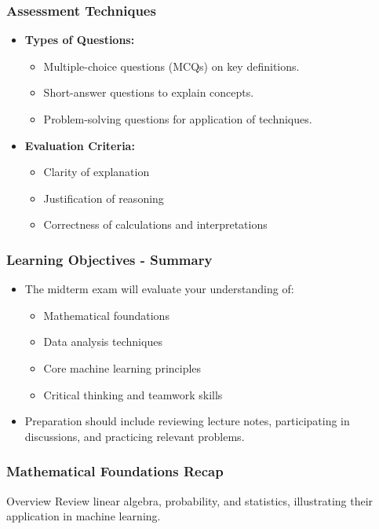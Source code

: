 \documentclass[aspectratio=169]{beamer}
\begin{document}
\begin{frame}[fragile]
    \frametitle{Assessment Techniques}
    \begin{itemize}
        \item \textbf{Types of Questions:}
        \begin{itemize}
            \item Multiple-choice questions (MCQs) on key definitions.
            \item Short-answer questions to explain concepts.
            \item Problem-solving questions for application of techniques.
        \end{itemize}
        
        \item \textbf{Evaluation Criteria:}
        \begin{itemize}
            \item Clarity of explanation
            \item Justification of reasoning
            \item Correctness of calculations and interpretations
        \end{itemize}
    \end{itemize}
\end{frame}

\begin{frame}[fragile]
    \frametitle{Learning Objectives - Summary}
    \begin{itemize}
        \item The midterm exam will evaluate your understanding of:
        \begin{itemize}
            \item Mathematical foundations
            \item Data analysis techniques
            \item Core machine learning principles
            \item Critical thinking and teamwork skills
        \end{itemize}
        \item Preparation should include reviewing lecture notes, participating in discussions, and practicing relevant problems.
    \end{itemize}
\end{frame}

\begin{frame}[fragile]
    \frametitle{Mathematical Foundations Recap}
    \begin{block}{Overview}
        Review linear algebra, probability, and statistics, illustrating their application in machine learning.
    \end{block}
\end{frame}
\end{document}
